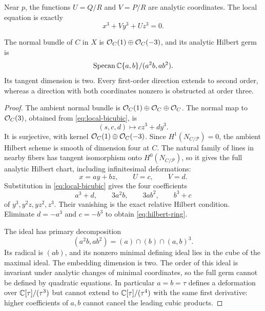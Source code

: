 Near $p$, the functions $U=Q/R$ and $V=P/R$ are analytic coordinates.
The local equation is exactly
\begin{equation}\label{eq:local-bicubic}
 x^3+Vy^3+Uz^3=0.
\end{equation}

\begin{proposition}\label{prop:hilbert}
The normal bundle of $C$ in $X$ is
$\mathcal O_C(1)\oplus\mathcal O_C(-3)$, and its analytic Hilbert germ is
\begin{equation}\label{eq:hilbert-ring}
 \operatorname{Specan}\mathbb C\{a,b\}/(a^2b,ab^2).
\end{equation}
Its tangent dimension is two. Every first-order direction extends
to second order, whereas a direction with both coordinates nonzero
is obstructed at order three.
\end{proposition}

\begin{proof}
The ambient normal bundle is
$\mathcal O_C(1)\oplus\mathcal O_C\oplus\mathcal O_C$.
The normal map to $\mathcal O_C(3)$, obtained from
\eqref{eq:local-bicubic}, is
\[
 (s,c,d)\longmapsto cz^3+dy^3.
\]
It is surjective, with kernel $\mathcal O_C(1)\oplus\mathcal O_C(-3)$.
Since $H^1(N_{C/\mathcal P})=0$, the ambient Hilbert scheme is
smooth of dimension four at $C$. The natural family of lines in
nearby fibers has tangent isomorphism onto $H^0(N_{C/\mathcal P})$,
so it gives the full analytic Hilbert chart, including infinitesimal
deformations:
\[
 x=ay+bz,\qquad U=c,\qquad V=d.
\]
Substitution in \eqref{eq:local-bicubic} gives the four coefficients
\begin{equation}\label{eq:four-coefficients}
 a^3+d,\qquad 3a^2b,\qquad 3ab^2,\qquad b^3+c
\end{equation}
of $y^3,y^2z,yz^2,z^3$. Their vanishing is the exact relative
Hilbert condition. Eliminate $d=-a^3$ and $c=-b^3$ to obtain
\eqref{eq:hilbert-ring}.

The ideal has primary decomposition
\begin{equation}\label{eq:primary}
 (a^2b,ab^2)=(a)\cap(b)\cap(a,b)^3.
\end{equation}
Its radical is $(ab)$, and its nonzero minimal defining ideal lies
in the cube of the maximal ideal. The embedding dimension is two.
The order of this ideal is invariant under analytic changes of
minimal coordinates, so the full germ cannot be defined by
quadratic equations. In particular $a=b=\tau$ defines a deformation
over $\mathbb C[\tau]/(\tau^3)$ but cannot extend to
$\mathbb C[\tau]/(\tau^4)$ with the same first derivative: higher
coefficients of $a,b$ cannot cancel the leading cubic products.
\end{proof}

